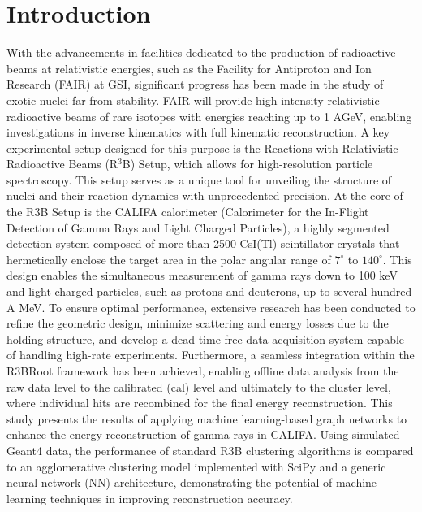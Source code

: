 \documentclass[final,5p,times,twocolumn]{elsarticle}
\begin{document}



\section{Introduction}
\label{sec:intro}
With the advancements in facilities dedicated to the production of radioactive beams at relativistic energies, such as the Facility for Antiproton and Ion Research (FAIR) at GSI, significant progress has been made in the study of exotic nuclei far from stability\cite{kalantar2024experiments}. FAIR will provide high-intensity relativistic radioactive beams of rare isotopes with energies reaching up to 1 AGeV, enabling investigations in inverse kinematics with full kinematic reconstruction\cite{leifels2025status}.
A key experimental setup designed for this purpose is the Reactions with Relativistic Radioactive Beams (R$^3$B) Setup, which allows for high-resolution particle spectroscopy. This setup serves as a unique tool for unveiling the structure of nuclei and their reaction dynamics with unprecedented precision.\newline
At the core of the R3B Setup is the CALIFA calorimeter (Calorimeter for the In-Flight Detection of Gamma Rays and Light Charged Particles), a highly segmented detection system composed of more than 2500 CsI(Tl) scintillator crystals that hermetically enclose the target area in the polar angular range of $7^\circ$ to $140^\circ$. This design enables the simultaneous measurement of gamma rays down to 100 keV and light charged particles, such as protons and deuterons, up to several hundred A MeV. To ensure optimal performance, extensive research has been conducted to refine the geometric design, minimize scattering and energy losses due to the holding structure, and develop a dead-time-free data acquisition system capable of handling high-rate experiments. Furthermore, a seamless integration within the R3BRoot framework has been achieved, enabling offline data analysis from the raw data level to the calibrated (cal) level and ultimately to the cluster level, where individual hits are recombined for the final energy reconstruction.\newline
This study presents the results of applying machine learning-based graph networks to enhance the energy reconstruction of gamma rays in CALIFA. Using simulated Geant4 data, the performance of standard R3B clustering algorithms is compared to an agglomerative clustering model implemented with SciPy and a generic neural network (NN) architecture, demonstrating the potential of machine learning techniques in improving reconstruction accuracy.\newline
\end{document}
